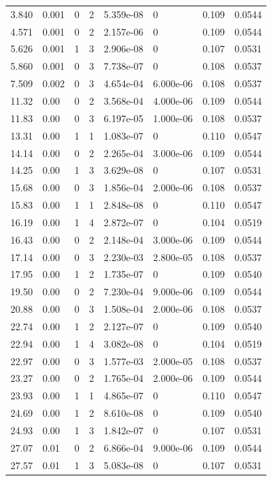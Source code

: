 \documentclass[preview]{standalone}
\begin{document}
{{\begin{tabular}{L{1.2cm}C{1.2cm} C{0.3cm}C{0.5cm} C{1.4cm}C{1.4cm} C{1.4cm}C{1.4cm}}
  3.840  &  0.001  & 0     &  2 &  5.359e-08  & 0  & 0.109 &  0.0544   \\ 
  4.571  &  0.001  & 0     &  2 &  2.157e-06  & 0  & 0.109 &  0.0544   \\ 
  5.626  &  0.001  & 1     &  3 &  2.906e-08  & 0  & 0.107 &  0.0531   \\ 
  5.860  &  0.001  & 0     &  3 &  7.738e-07  & 0  & 0.108 &  0.0537   \\ 
  7.509  &  0.002  & 0     &  3 &  4.654e-04  & 6.000e-06  & 0.108 &  0.0537   \\ 
  11.32  &  0.00  & 0     &  2 &  3.568e-04  & 4.000e-06  & 0.109 &  0.0544   \\ 
  11.83  &  0.00  & 0     &  3 &  6.197e-05  & 1.000e-06  & 0.108 &  0.0537   \\ 
  13.31  &  0.00  & 1     &  1 &  1.083e-07  & 0  & 0.110 &  0.0547   \\ 
  14.14  &  0.00  & 0     &  2 &  2.265e-04  & 3.000e-06  & 0.109 &  0.0544   \\ 
  14.25  &  0.00  & 1     &  3 &  3.629e-08  & 0  & 0.107 &  0.0531   \\ 
  15.68  &  0.00  & 0     &  3 &  1.856e-04  & 2.000e-06  & 0.108 &  0.0537   \\ 
  15.83  &  0.00  & 1     &  1 &  2.848e-08  & 0  & 0.110 &  0.0547   \\ 
  16.19  &  0.00  & 1     &  4 &  2.872e-07  & 0  & 0.104 &  0.0519   \\ 
  16.43  &  0.00  & 0     &  2 &  2.148e-04  & 3.000e-06  & 0.109 &  0.0544   \\ 
  17.14  &  0.00  & 0     &  3 &  2.230e-03  & 2.800e-05  & 0.108 &  0.0537   \\ 
  17.95  &  0.00  & 1     &  2 &  1.735e-07  & 0  & 0.109 &  0.0540   \\ 
  19.50  &  0.00  & 0     &  2 &  7.230e-04  & 9.000e-06  & 0.109 &  0.0544   \\ 
  20.88  &  0.00  & 0     &  3 &  1.508e-04  & 2.000e-06  & 0.108 &  0.0537   \\ 
  22.74  &  0.00  & 1     &  2 &  2.127e-07  & 0  & 0.109 &  0.0540   \\ 
  22.94  &  0.00  & 1     &  4 &  3.082e-08  & 0  & 0.104 &  0.0519   \\ 
  22.97  &  0.00  & 0     &  3 &  1.577e-03  & 2.000e-05  & 0.108 &  0.0537   \\ 
  23.27  &  0.00  & 0     &  2 &  1.765e-04  & 2.000e-06  & 0.109 &  0.0544   \\ 
  23.93  &  0.00  & 1     &  1 &  4.865e-07  & 0  & 0.110 &  0.0547   \\ 
  24.69  &  0.00  & 1     &  2 &  8.610e-08  & 0  & 0.109 &  0.0540   \\ 
  24.93  &  0.00  & 1     &  3 &  1.842e-07  & 0  & 0.107 &  0.0531   \\ 
  27.07  &  0.01  & 0     &  2 &  6.866e-04  & 9.000e-06  & 0.109 &  0.0544   \\ 
  27.57  &  0.01  & 1     &  3 &  5.083e-08  & 0  & 0.107 &  0.0531   \\ 
\hline 
\end{tabular} 

}}
\end{document}

